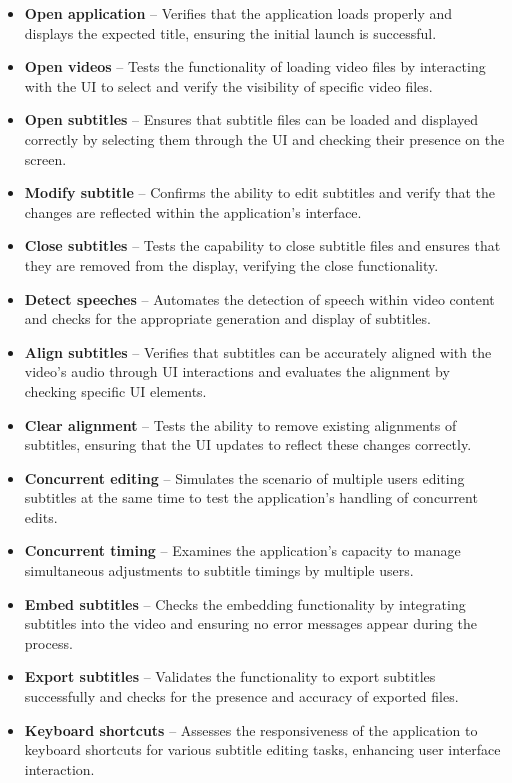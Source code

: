 \begin{itemize}
\item \textbf{Open application} -- Verifies that the application loads properly and displays the expected title, ensuring the initial launch is successful.
\item \textbf{Open videos} -- Tests the functionality of loading video files by interacting with the UI to select and verify the visibility of specific video files.
\item \textbf{Open subtitles} -- Ensures that subtitle files can be loaded and displayed correctly by selecting them through the UI and checking their presence on the screen.
\item \textbf{Modify subtitle} -- Confirms the ability to edit subtitles and verify that the changes are reflected within the application's interface.
\item \textbf{Close subtitles} -- Tests the capability to close subtitle files and ensures that they are removed from the display, verifying the close functionality.
\item \textbf{Detect speeches} -- Automates the detection of speech within video content and checks for the appropriate generation and display of subtitles.
\item \textbf{Align subtitles} -- Verifies that subtitles can be accurately aligned with the video's audio through UI interactions and evaluates the alignment by checking specific UI elements.
\item \textbf{Clear alignment} -- Tests the ability to remove existing alignments of subtitles, ensuring that the UI updates to reflect these changes correctly.
\item \textbf{Concurrent editing} -- Simulates the scenario of multiple users editing subtitles at the same time to test the application's handling of concurrent edits.
\item \textbf{Concurrent timing} -- Examines the application's capacity to manage simultaneous adjustments to subtitle timings by multiple users.
\item \textbf{Embed subtitles} -- Checks the embedding functionality by integrating subtitles into the video and ensuring no error messages appear during the process.
\item \textbf{Export subtitles} -- Validates the functionality to export subtitles successfully and checks for the presence and accuracy of exported files.
\item \textbf{Keyboard shortcuts} -- Assesses the responsiveness of the application to keyboard shortcuts for various subtitle editing tasks, enhancing user interface interaction.
\end{itemize}

